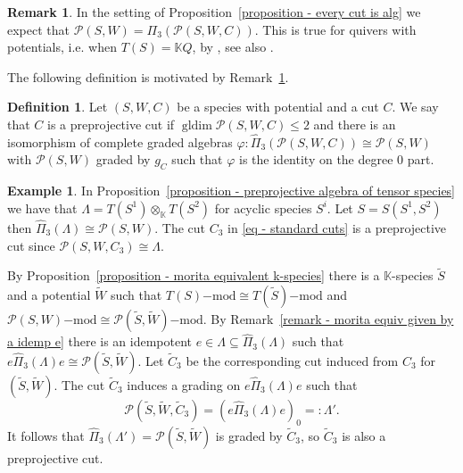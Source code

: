 \documentclass[a4paper, reqno]{amsart}
\theoremstyle{definition}
\newtheorem{mydef}[mythm]{Definition}
\newtheorem{myrem}[mythm]{Remark}
\newtheorem{myex}[mythm]{Example}
\newcommand{\K}{\mathbb{K}}
\DeclareMathOperator{\gldim}{\mathrm{gldim}}
\begin{document}
\begin{myrem}\label{remark - jacobian as prerojecive}
	In the setting of Proposition~\ref{proposition - every cut is alg} we expect that $\mathcal{P}(S, W) = \Pi_3(\mathcal{P}(S, W, C))$. This is true for quivers with potentials, i.e. when $T(S) = \K Q$, by \cite{Keller2011CYcompletions}, see also \cite[Proposition 3.9]{HerschendOsamu2011quiverwithpotential}.
\end{myrem}

The following definition is motivated by Remark~\ref{remark - jacobian as prerojecive}.

\begin{mydef}
	Let $(S, W, C)$ be a species with potential and a cut $C$. We say that $C$ is a preprojective cut if $\gldim \mathcal{P}(S, W, C)\le 2$ and there is an isomorphism of complete graded algebras $\varphi: \widehat{\Pi}_3(\mathcal{P}(S, W, C)) \cong \mathcal{P}(S, W)$ with $\mathcal{P}(S, W)$ graded by $g_C$ such that $\varphi$ is the identity on the degree $0$ part.
\end{mydef}

\begin{myex}
	In Proposition~\ref{proposition - preprojective algebra of tensor species} we have that $\Lambda = T(S^1)\otimes_\K T(S^2)$ for acyclic species $S^i$. Let $S = S(S^1, S^2)$ then $\widehat{\Pi}_3(\Lambda) \cong \mathcal{P}(S, W)$. The cut $C_3$ in \eqref{eq - standard cuts} is a preprojective cut since $\mathcal{P}(S, W, C_3) \cong \Lambda$.

	By Proposition~\ref{proposition - morita equivalent k-species} there is a $\K$-species $\tilde{S}$ and a potential $\tilde{W}$ such that $T(S)\mathrm{-mod}\cong T(\tilde{S})\mathrm{-mod}$ and $\mathcal{P}(S, W)\mathrm{-mod}\cong \mathcal{P}(\tilde{S}, \tilde{W})\mathrm{-mod}$. By Remark~\ref{remark - morita equiv given by a idemp e} there is an idempotent $e\in \Lambda\subseteq \widehat{\Pi}_3(\Lambda)$ such that $e\widehat{\Pi}_3(\Lambda)e \cong \mathcal{P}(\tilde{S}, \tilde{W})$. Let $\tilde{C}_3$ be the corresponding cut induced from $C_3$ for $(\tilde{S}, \tilde{W})$. The cut $\tilde{C}_3$ induces a grading on $e\widehat{\Pi}_3(\Lambda)e$ such that 
	\begin{equation*}
		\mathcal{P}(\tilde{S}, \tilde{W}, \tilde{C}_3) = (e\widehat{\Pi}_3(\Lambda)e)_0 =: \Lambda'.
	\end{equation*}
	It follows that $\widehat{\Pi}_3(\Lambda') = \mathcal{P}(\tilde{S}, \tilde{W})$ is graded by $\tilde{C}_3$, so $\tilde{C}_3$ is also a preprojective cut.
\end{myex}
\end{document}
